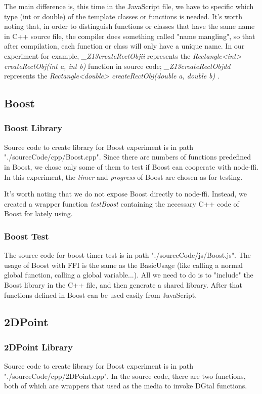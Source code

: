      
The main difference is, this time in the JavaScript file, we have to specific which type (int or double) of the template classes or functions is needed. It's worth noting that, in order to distinguish functions or classes that have the same name in C++ source file, the compiler does something called "name mangling", so that after compilation, each function or class will only have a unique name. In our experiment for example, \textit{\_Z13createRectObjii} represents the \textit{Rectangle<int> createRectObj(int a, int b)} function in source code; \textit{\_Z13createRectObjdd} represents the \textit{Rectangle<double> createRectObj(double a, double b)} .
    
     
\subsection{Boost}       
\subsubsection{Boost Library}
Source code to create library for Boost experiment is in path "./sourceCode/cpp/Boost.cpp". Since there are numbers of functions predefined in Boost, we chose only some of them to test if Boost can cooperate with node-ffi. In this experiment, the \textit{timer} and \textit{progress} of Boost are chosen as for testing.

It's worth noting that we do not expose Boost directly to node-ffi. Instead, we created a wrapper function \textit{testBoost} containing the necessary C++ code of Boost for lately using.
\subsubsection{Boost Test}  
     
The source code for boost timer test is in path "./sourceCode/js/Boost.js". The usage of Boost with FFI is the same as the BasicUsage (like calling a normal global function, calling a global variable...). All we need to do is to "include" the Boost library in the C++ file, and then generate a shared library. After that functions defined in Boost can be used easily from JavaScript.     
     


\subsection{2DPoint}
\subsubsection{2DPoint Library}
Source code to create library for Boost experiment is in path "./sourceCode/cpp/2DPoint.cpp".
In the source code, there are two functions, both of which are wrappers that used as the media to invoke DGtal functions.
       
